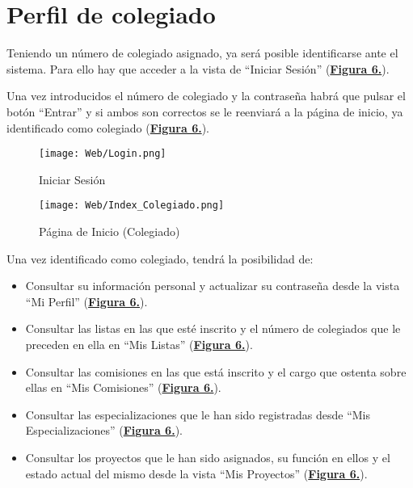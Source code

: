\section{Perfil de colegiado}
\addtocounter{figura_manual}{1} Teniendo un número de colegiado asignado, ya será posible identificarse ante el sistema. Para ello hay que acceder a la vista de ``Iniciar Sesión'' (\textbf{\hyperref[fig:Web_Login]{Figura 6.}}).\addtocounter{figura_manual}{1} Una vez introducidos el número de colegiado y la contraseña habrá que pulsar el botón ``Entrar'' y si ambos son correctos se le reenviará a la página de inicio, ya identificado como colegiado (\textbf{\hyperref[fig:Web_Index_Colegiado]{Figura 6.}}).
\begin{figure}[!htbp]
  \centering
  \texttt{[image: Web/Login.png]}
  \caption{Iniciar Sesión}
  \label{fig:Web_Login}
\end{figure}
\FloatBarrier

\begin{figure}[!htbp]
  \centering
  \texttt{[image: Web/Index\_Colegiado.png]}
  \caption{Página de Inicio (Colegiado)}
  \label{fig:Web_Index_Colegiado}
\end{figure}
\FloatBarrier

Una vez identificado como colegiado, tendrá la posibilidad de:
\begin{itemize}
  \item \addtocounter{figura_manual}{1} Consultar su información personal y actualizar su contraseña desde la vista ``Mi Perfil'' (\textbf{\hyperref[fig:Web_Coleg_MiPerfil]{Figura 6.}}).
  \item \addtocounter{figura_manual}{1} Consultar las listas en las que esté inscrito y el número de colegiados que le preceden en ella en ``Mis Listas'' (\textbf{\hyperref[fig:Web_Coleg_MisListas]{Figura 6.}}).
  \item \addtocounter{figura_manual}{1} Consultar las comisiones en las que está inscrito y el cargo que ostenta sobre ellas en ``Mis Comisiones'' (\textbf{\hyperref[fig:Web_Coleg_MisComisiones]{Figura 6.}}).
  \item \addtocounter{figura_manual}{1} Consultar las especializaciones que le han sido registradas desde ``Mis Especializaciones'' (\textbf{\hyperref[fig:Web_Coleg_MisEspecializaciones]{Figura 6.}}).
  \item \addtocounter{figura_manual}{1} Consultar los proyectos que le han sido asignados, su función en ellos y el estado actual del mismo desde la vista ``Mis Proyectos'' (\textbf{\hyperref[fig:Web_Coleg_MisProyectos]{Figura 6.}}).
\end{itemize}

